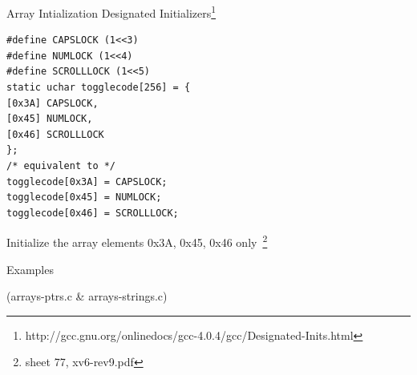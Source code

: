 \documentclass[10pt]{beamer}
\begin{document}
\begin{frame}[fragile]{Array Intialization}
Designated Initializers\footnote{http://gcc.gnu.org/onlinedocs/gcc-4.0.4/gcc/Designated-Inits.html}
\begin{verbatim}
#define CAPSLOCK (1<<3)
#define NUMLOCK (1<<4)
#define SCROLLLOCK (1<<5)
static uchar togglecode[256] = {
[0x3A] CAPSLOCK,
[0x45] NUMLOCK,
[0x46] SCROLLLOCK
};
/* equivalent to */
togglecode[0x3A] = CAPSLOCK;
togglecode[0x45] = NUMLOCK;
togglecode[0x46] = SCROLLLOCK;
\end{verbatim}
Initialize the array elements 0x3A, 0x45, 0x46 only~\footnote{sheet 77, xv6-rev9.pdf}
\end{frame}

\begin{frame}[standout]
  Examples

  (arrays-ptrs.c \& arrays-strings.c)

\end{frame}
\end{document}
